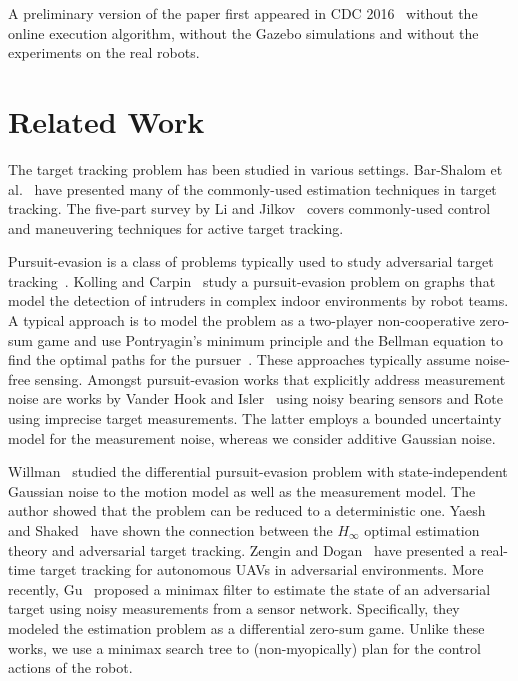 \documentclass[journal]{IEEEtran}
\begin{document}
A preliminary version of the paper first appeared in CDC 2016~\cite{zhang2016non} without the online execution algorithm, without the Gazebo simulations and without the experiments on the real robots.

\section{Related Work} \label{sec:relwork}
The target tracking problem has been studied in various settings. Bar-Shalom et al.~\cite{bar2004estimation} have presented many of the commonly-used estimation techniques in target tracking. The five-part survey by Li and Jilkov~\cite{li2003survey,li2010survey,li2001survey,li2002survey,li2005survey} covers commonly-used control and maneuvering techniques for active target tracking.  

Pursuit-evasion is a class of problems typically used to study adversarial target tracking~\cite{chung2011search}. Kolling and Carpin~\cite{kolling2010pursuit} study a pursuit-evasion problem on graphs that model the detection of intruders in complex indoor environments by robot teams.  A typical approach is to model the problem as a two-player non-cooperative zero-sum game and use Pontryagin’s minimum principle and the Bellman equation to find the optimal paths for the pursuer~\cite{bacsar1998dynamic,lewis1995optimal,bhattacharya2009existence,bhattacharya2009game}. These approaches typically assume noise-free sensing. Amongst pursuit-evasion works that explicitly address measurement noise are works by Vander Hook and Isler~\cite{vander2014pursuit} using noisy bearing sensors and Rote~\cite{rote2003pursuit} using imprecise target measurements. The latter employs a bounded uncertainty model for the measurement noise, whereas we consider additive Gaussian noise.

Willman~\cite{willman1969formal} studied the differential pursuit-evasion problem with state-independent Gaussian noise to the motion model as well as the measurement model. The author showed that the problem can be reduced to a deterministic one. Yaesh and Shaked~\cite{yaesh1992game} have shown the connection between the $H_{\infty}$ optimal estimation theory and adversarial target tracking. Zengin and Dogan~\cite{zengin2007real} have presented a real-time target tracking for autonomous UAVs in adversarial environments. More recently, Gu~\cite{gu2011game} proposed a minimax filter to estimate the state of an adversarial target using noisy measurements from a sensor network. Specifically, they modeled the estimation problem as a differential zero-sum game. Unlike these works, we use a minimax search tree to (non-myopically) plan for the control actions of the robot.
\end{document}
